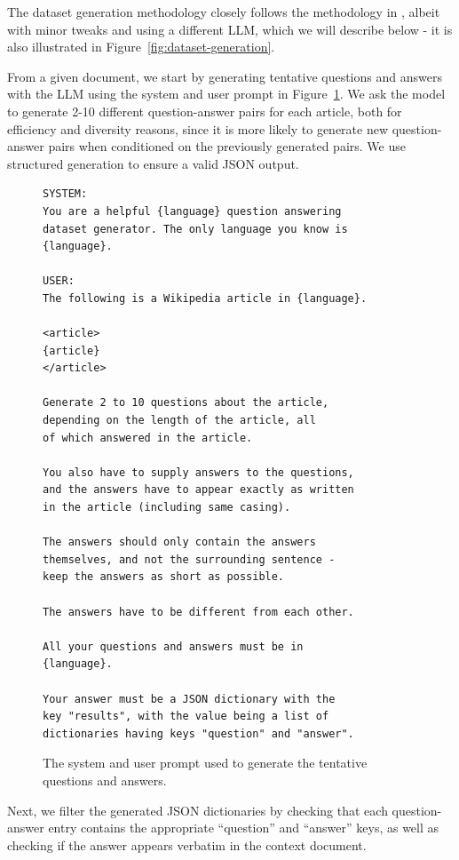 \documentclass[10pt, a4paper]{article}
\begin{document}
The dataset generation methodology closely follows the methodology in , albeit with minor tweaks and using a different LLM, which we will describe below - it is also illustrated in Figure~\ref{fig:dataset-generation}.

From a given document, we start by generating tentative questions and answers with the LLM using the system and user prompt in Figure~\ref{fig:generation-prompt}. We ask the model to generate 2-10 different question-answer pairs for each article, both for efficiency and diversity reasons, since it is more likely to generate new question-answer pairs when conditioned on the previously generated pairs. We use structured generation to ensure a valid JSON output.

\begin{figure}
\scriptsize
\begin{verbatim}
SYSTEM:
You are a helpful {language} question answering
dataset generator. The only language you know is
{language}.

USER:
The following is a Wikipedia article in {language}.

<article>
{article}
</article>

Generate 2 to 10 questions about the article,
depending on the length of the article, all
of which answered in the article.

You also have to supply answers to the questions,
and the answers have to appear exactly as written
in the article (including same casing).

The answers should only contain the answers
themselves, and not the surrounding sentence -
keep the answers as short as possible.

The answers have to be different from each other.

All your questions and answers must be in
{language}.

Your answer must be a JSON dictionary with the
key "results", with the value being a list of
dictionaries having keys "question" and "answer".
\end{verbatim}
\caption{The system and user prompt used to generate the tentative questions and answers.}
\label{fig:generation-prompt}
\end{figure}

Next, we filter the generated JSON dictionaries by checking that each question-answer entry contains the appropriate ``question'' and ``answer'' keys, as well as checking if the answer appears verbatim in the context document.
\end{document}
